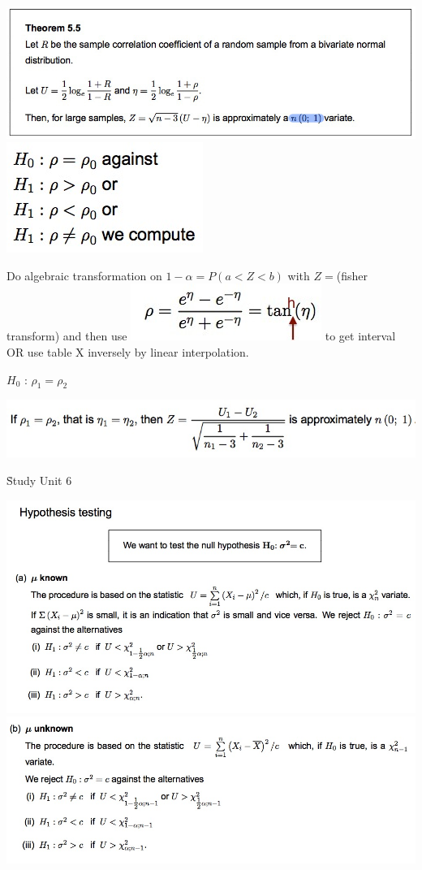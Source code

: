 \documentclass{examnotes}
\begin{document}
\includegraphics[scale=0.45]{./img/fischer.jpg}
\includegraphics[scale=0.5]{./img/fishhyp.jpg}
 
Do algebraic transformation on $1-\alpha=P(a<Z<b)$ with $Z=$(fisher transform) and then use \includegraphics[scale=0.5]{./img/ntrans.jpg} to get interval OR use table X inversely by linear interpolation.

$H_0$ : $\rho_1=\rho_2$

\includegraphics[scale=0.5]{./img/eqcor.jpg}

\h{Study Unit 6}

\includegraphics[scale=0.5]{./img/st61.jpg}
\includegraphics[scale=0.5]{./img/st62.jpg}
\end{document}
